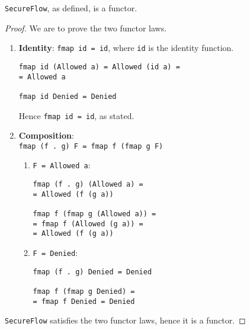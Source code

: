 \begin{proposition}
\texttt{SecureFlow}, as defined, is a functor.
\end{proposition}
\begin{proof}
We are to prove the two functor laws.
\begin{enumerate}
	\item \textbf{Identity}: \texttt{fmap id = id}, where \texttt{id} is the identity function.
	\begin{lstlisting}
fmap id (Allowed a) = Allowed (id a) =
= Allowed a

fmap id Denied = Denied
	\end{lstlisting}
	Hence \texttt{fmap id = id}, as stated.
	\item \textbf{Composition}:\\ \texttt{fmap (f . g) F = fmap f (fmap g F)}
	\begin{enumerate}
		\item \texttt{F = Allowed a}:
		\begin{lstlisting}
fmap (f . g) (Allowed a) = 
= Allowed (f (g a))

fmap f (fmap g (Allowed a)) =
= fmap f (Allowed (g a)) =
= Allowed (f (g a))
		\end{lstlisting}
		\item \texttt{F = Denied}:
		\begin{lstlisting}
fmap (f . g) Denied = Denied 

fmap f (fmap g Denied) =
= fmap f Denied = Denied
		\end{lstlisting}
	\end{enumerate}
\end{enumerate}
\texttt{SecureFlow} satisfies the two functor laws, hence it is a functor.
\end{proof}